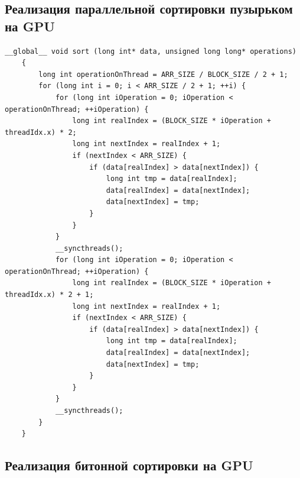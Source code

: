 \documentclass[a4paper,article]{article}
\begin{document}
    \subsection{Реализация параллельной сортировки пузырьком на GPU}

    \begin{lstlisting}[label=gpu-parallel-bubble-sort,caption=Параллельная пузырьковая сортировка на GPU]
    __global__ void sort (long int* data, unsigned long long* operations)
    {
        long int operationOnThread = ARR_SIZE / BLOCK_SIZE / 2 + 1;
        for (long int i = 0; i < ARR_SIZE / 2 + 1; ++i) {
            for (long int iOperation = 0; iOperation < operationOnThread; ++iOperation) {
                long int realIndex = (BLOCK_SIZE * iOperation + threadIdx.x) * 2;
                long int nextIndex = realIndex + 1;
                if (nextIndex < ARR_SIZE) {
                    if (data[realIndex] > data[nextIndex]) {
                        long int tmp = data[realIndex];
                        data[realIndex] = data[nextIndex];
                        data[nextIndex] = tmp;
                    }
                }
            }
            __syncthreads();
            for (long int iOperation = 0; iOperation < operationOnThread; ++iOperation) {
                long int realIndex = (BLOCK_SIZE * iOperation + threadIdx.x) * 2 + 1;
                long int nextIndex = realIndex + 1;
                if (nextIndex < ARR_SIZE) {
                    if (data[realIndex] > data[nextIndex]) {
                        long int tmp = data[realIndex];
                        data[realIndex] = data[nextIndex];
                        data[nextIndex] = tmp;
                    }
                }
            }
            __syncthreads();
        }
    }
    \end{lstlisting}

    \subsection{Реализация битонной сортировки на GPU}
\end{document}
